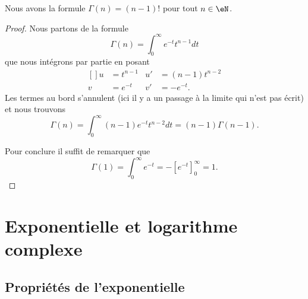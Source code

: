 \begin{proposition}
	Nous avons la formule \( \Gamma(n)=(n-1)!\) pour tout \( n\in \eN\).
\end{proposition}

\begin{proof}
	Nous partons de la formule
	\begin{equation}
		\Gamma(n)=\int_0^{\infty} e^{-t}t^{n-1}dt
	\end{equation}
	que nous intégrons par partie en posant
	\begin{equation}
		\begin{aligned}[]
			u & =t^{n-1} & u' & =(n-1)t^{n-2} \\
			v & = e^{-t} & v' & =- e^{-t}.
		\end{aligned}
	\end{equation}
	Les termes au bord s'annulent (ici il y a un passage à la limite qui n'est pas écrit) et nous trouvons
	\begin{equation}
		\Gamma(n)=\int_0^{\infty}(n-1) e^{-t}t^{n-2}dt=(n-1)\Gamma(n-1).
	\end{equation}

	Pour conclure il suffit de remarquer que
	\begin{equation}
		\Gamma(1)=\int_0^{\infty}e^{-t}=-[ e^{-t}]_0^{\infty}=1.
	\end{equation}
\end{proof}

\section{Exponentielle et logarithme complexe}

\subsection{Propriétés de l'exponentielle}

